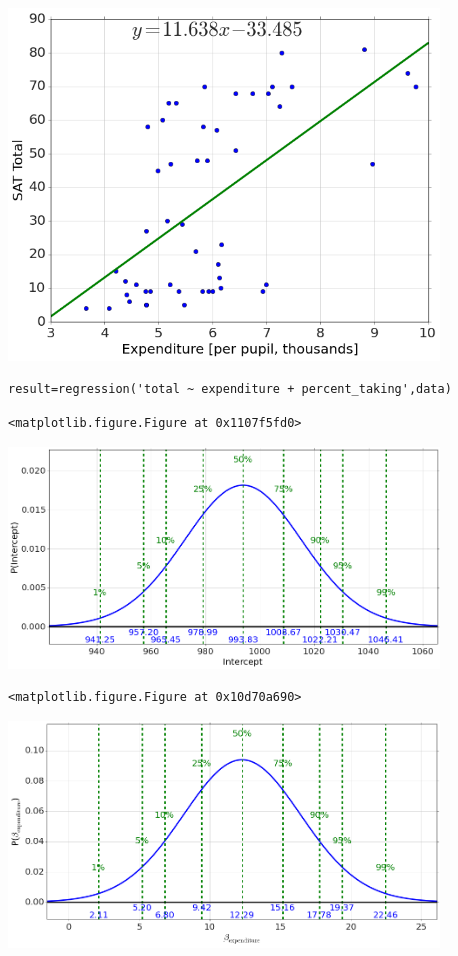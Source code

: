 \begin{center}\includegraphics[width=4.5in]{Regression/Regression_fig9.png}\end{center}

\begin{lstlisting}
result=regression('total ~ expenditure + percent_taking',data)
\end{lstlisting}

\begin{verbatim}
<matplotlib.figure.Figure at 0x1107f5fd0>\end{verbatim}

\begin{center}\includegraphics[width=4.5in]{Regression/Regression_fig10.png}\end{center}

\begin{verbatim}
<matplotlib.figure.Figure at 0x10d70a690>\end{verbatim}

\begin{center}\includegraphics[width=4.5in]{Regression/Regression_fig11.png}\end{center}

